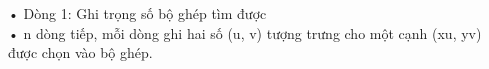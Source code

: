 • Dòng 1: Ghi trọng số bộ ghép tìm được   
\\   • n dòng tiếp, mỗi dòng ghi hai số (u, v) tượng trưng cho một cạnh (xu, yv) được chọn vào bộ ghép.